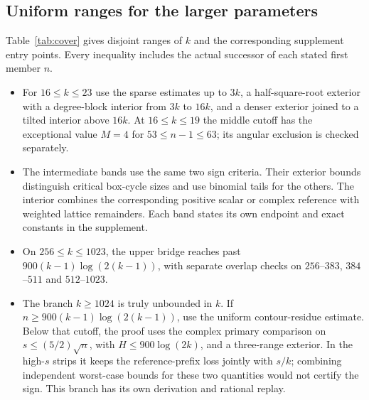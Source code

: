 \documentclass[11pt,reqno]{amsart}
\theoremstyle{remark}
\begin{document}
\subsection{Uniform ranges for the larger parameters}
Table~\ref{tab:cover} gives disjoint ranges of $k$ and the corresponding supplement entry points. Every inequality includes the actual successor of each stated first member $n$.
\begin{itemize}
 \item For $16\le k\le23$ use the sparse estimates up to $3k$, a half-square-root exterior with a degree-block interior from $3k$ to $16k$, and a denser exterior joined to a tilted interior above $16k$. At $16\le k\le19$ the middle cutoff has the exceptional value $M=4$ for $53\le n-1\le63$; its angular exclusion is checked separately.
 \item The intermediate bands use the same two sign criteria. Their exterior bounds distinguish critical box-cycle sizes and use binomial tails for the others. The interior combines the corresponding positive scalar or complex reference with weighted lattice remainders. Each band states its own endpoint and exact constants in the supplement.
 \item On $256\le k\le1023$, the upper bridge reaches past $900(k-1)\log(2(k-1))$, with separate overlap checks on $256$--$383$, $384$--$511$ and $512$--$1023$.
 \item The branch $k\ge1024$ is truly unbounded in $k$. If $n\ge900(k-1)\log(2(k-1))$, use the uniform contour-residue estimate. Below that cutoff, the proof uses the complex primary comparison on $s\le(5/2)\sqrt n$, with $H\le900\log(2k)$, and a three-range exterior. In the high-$s$ strips it keeps the reference-prefix loss jointly with $s/k$; combining independent worst-case bounds for these two quantities would not certify the sign. This branch has its own derivation and rational replay.
\end{itemize}
\end{document}
